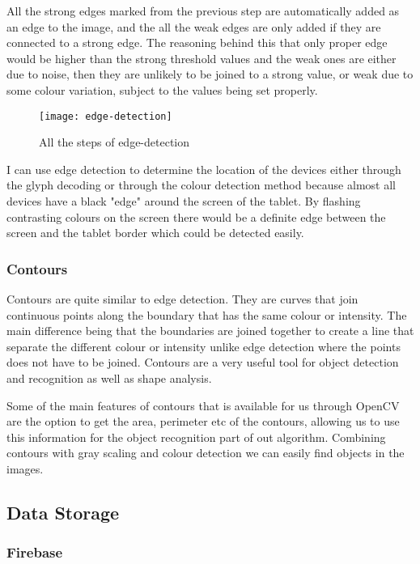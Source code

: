 \begin{enumerate}
All the strong edges marked from the previous step are automatically added as an edge to the image, and the all the weak edges are only added if they are connected to a strong edge. The reasoning behind this that only proper edge would be higher than the strong threshold values and the weak ones are either due to noise, then they are unlikely to be joined to a strong value, or weak due to some colour variation, subject to the values being set properly.
\end{enumerate}

\begin{figure}[H]
\centering
\texttt{[image: edge-detection]}
\caption{All the steps of edge-detection \cite{canny-tutorial}}
\label{edge-detection-steps}
\end{figure}

I can use edge detection to determine the location of the devices either through the glyph decoding or through the colour detection method because almost all devices have a black "edge" around the screen of the tablet. By flashing contrasting colours on the screen there would be a definite edge between the screen and the tablet border which could be detected easily.
\subsubsection{Contours}
Contours are quite similar to edge detection. They are curves that join continuous points along the boundary that has the same colour or intensity\cite{contour-opencv}. The main difference being that the boundaries are joined together to create a line that separate the different colour or intensity unlike edge detection where the points does not have to be joined. Contours are a very useful tool for object detection and recognition as well as shape analysis.

Some of the main features of contours that is available for us through OpenCV are the option to get the area, perimeter etc of the contours\cite{contour-features}, allowing us to use this information for the object recognition part of out algorithm. Combining contours with gray scaling and colour detection we can easily find objects in the images.




\subsection{Data Storage}
\subsubsection{Firebase}

